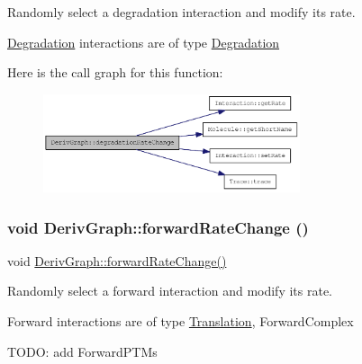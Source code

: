 Randomly select a degradation interaction and modify its rate.

\hyperlink{classDegradation}{Degradation} interactions are of type \hyperlink{classDegradation}{Degradation} 

Here is the call graph for this function:\nopagebreak
\begin{figure}[H]
\begin{center}
\leavevmode
\includegraphics[width=214pt]{classDerivGraph_a038841806aa1fe80a9450f977baa1fd2_cgraph}
\end{center}
\end{figure}
\hypertarget{classDerivGraph_afbda567a3f51d05fad37eb46fc121a89}{
\subsubsection[{forwardRateChange}]{\setlength{\rightskip}{0pt plus 5cm}void DerivGraph::forwardRateChange ()}}
\label{classDerivGraph_afbda567a3f51d05fad37eb46fc121a89}
void \hyperlink{classDerivGraph_afbda567a3f51d05fad37eb46fc121a89}{DerivGraph::forwardRateChange()}

Randomly select a forward interaction and modify its rate.

Forward interactions are of type \hyperlink{classTranslation}{Translation}, ForwardComplex

TODO: add ForwardPTMs 

